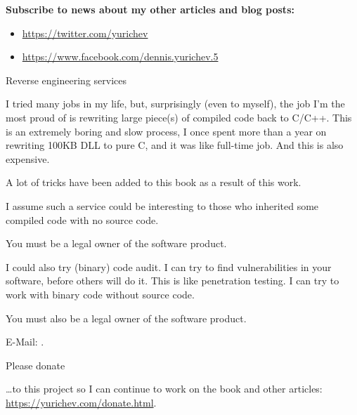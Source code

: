 \vspace*{\fill}

\normalsize \textbf{Subscribe to news about my other articles and blog posts:}

\bigskip
\bigskip
\bigskip

\begin{itemize}

\item \url{https://twitter.com/yurichev}

\item \url{https://www.facebook.com/dennis.yurichev.5}

\end{itemize}

\bigskip
\bigskip
\bigskip
\huge Reverse engineering services
\normalsize

\bigskip
\bigskip
\bigskip

I tried many jobs in my life, but, surprisingly (even to myself),
the job I'm the most proud of is rewriting large piece(s) of compiled code back to C/C++.
This is an extremely boring and slow process, I once spent more than a year on rewriting 100KB DLL to pure C,
and it was like full-time job.
And this is also expensive.

A lot of tricks have been added to this book as a result of this work.

I assume such a service could be interesting to those who inherited some compiled code with no source code.

You must be a legal owner of the software product.

\bigskip

I could also try (binary) code audit.
I can try to find vulnerabilities in your software, before others will do it.
This is like penetration testing.
I can try to work with binary code without source code.

You must also be a legal owner of the software product.

E-Mail: \GTT{\EMAIL}.

\bigskip
\bigskip
\bigskip

\huge Please donate
\normalsize

\bigskip
\bigskip
\bigskip

\dots to this project so I can continue to work on the book and other articles: \\
\url{https://yurichev.com/donate.html}.

